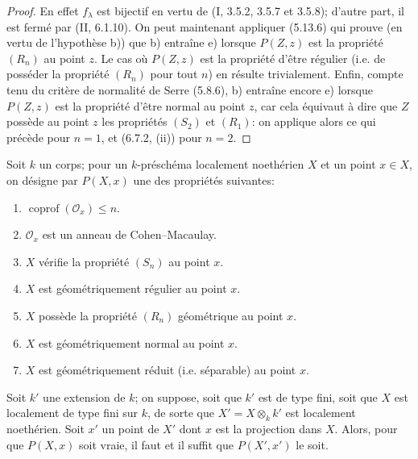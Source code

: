 \begin{proof}

En effet $f_\lambda$ est bijectif en vertu de (I, 3.5.2, 3.5.7 et 3.5.8);
d'autre part, il est fermé par (II, 6.1.10). On peut maintenant appliquer
(5.13.6) qui prouve (en vertu de l'hypothèse b)) que b) entraîne e) lorsque
$P(Z,z)$ est la propriété $(R_n)$ au point $z$. Le cas où $P(Z,z)$ est la
propriété d'être régulier (i.e. de posséder la propriété $(R_n)$ pour tout $n$)
en résulte trivialement. Enfin, compte tenu du critère de normalité de Serre
(5.8.6), b) entraîne encore e) lorsque $P(Z,z)$ est la propriété d'être normal
au point $z$, car cela équivaut à dire que $Z$ possède au point $z$ les
propriétés $(S_2)$ et $(R_1)$: on applique alors ce qui précède pour $n=1$,
et (6.7.2, (ii)) pour $n=2$.
\end{proof}

\begin{corollary}[6.7.8]
\label{IV.2.s6.7.8-fr}
Soit $k$ un corps; pour un $k$-préschéma localement noethérien $X$ et un
point $x\in X$, on désigne par $P(X,x)$ une des propriétés suivantes:
\begin{enumerate}
\item[(i)] $\operatorname{coprof}(\mathcal O_x)\leq n$.
\item[(ii)] $\mathcal O_x$ est un anneau de Cohen--Macaulay.
\item[(iii)] $X$ vérifie la propriété $(S_n)$ au point $x$.
\item[(iv)] $X$ est géométriquement régulier au point $x$.
\item[(v)] $X$ possède la propriété $(R_n)$ géométrique au point $x$.
\item[(vi)] $X$ est géométriquement normal au point $x$.
\item[(vii)] $X$ est géométriquement réduit (i.e. séparable) au point $x$.
\end{enumerate}
Soit $k'$ une extension de $k$; on suppose, soit que $k'$ est de type fini,
soit que $X$ est localement de type fini sur $k$, de sorte que
$X'=X\otimes_k k'$ est localement noethérien. Soit $x'$ un point de $X'$ dont
$x$ est la projection dans $X$. Alors, pour que $P(X,x)$ soit vraie, il faut
et il suffit que $P(X',x')$ le soit.
\end{corollary}

